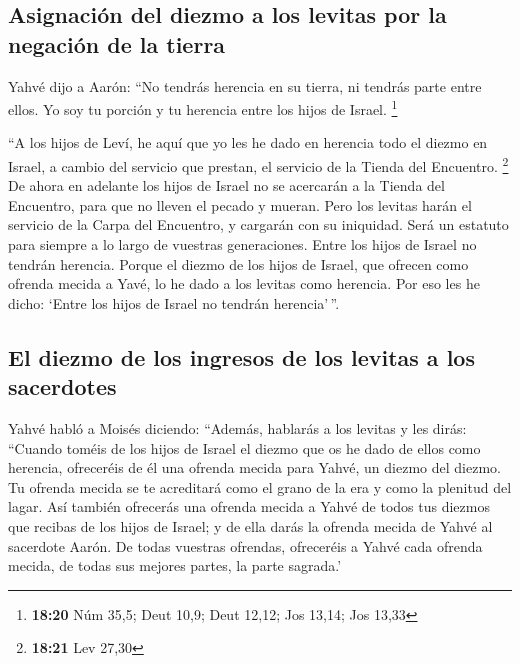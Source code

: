 \begin{paracol}{2}
\hypertarget{asignaciuxf3n-del-diezmo-a-los-levitas-por-la-negaciuxf3n-de-la-tierra}{%
\subsection{Asignación del diezmo a los levitas por la negación de la
tierra}\label{asignaciuxf3n-del-diezmo-a-los-levitas-por-la-negaciuxf3n-de-la-tierra}}

 Yahvé dijo a Aarón: ``No tendrás herencia en su tierra,
ni tendrás parte entre ellos. Yo soy tu porción y tu herencia entre los
hijos de Israel. \footnote{\textbf{18:20} Núm 35,5; Deut 10,9; Deut
  12,12; Jos 13,14; Jos 13,33}

 ``A los hijos de Leví, he aquí que yo les he dado en
herencia todo el diezmo en Israel, a cambio del servicio que prestan, el
servicio de la Tienda del Encuentro. \footnote{\textbf{18:21} Lev 27,30}
 De ahora en adelante los hijos de Israel no se acercarán
a la Tienda del Encuentro, para que no lleven el pecado y mueran.
 Pero los levitas harán el servicio de la Carpa del
Encuentro, y cargarán con su iniquidad. Será un estatuto para siempre a
lo largo de vuestras generaciones. Entre los hijos de Israel no tendrán
herencia.  Porque el diezmo de los hijos de Israel, que
ofrecen como ofrenda mecida a Yavé, lo he dado a los levitas como
herencia. Por eso les he dicho: `Entre los hijos de Israel no tendrán
herencia'\,''.

\hypertarget{el-diezmo-de-los-ingresos-de-los-levitas-a-los-sacerdotes}{%
\subsection{El diezmo de los ingresos de los levitas a los
sacerdotes}\label{el-diezmo-de-los-ingresos-de-los-levitas-a-los-sacerdotes}}

 Yahvé habló a Moisés diciendo:  ``Además,
hablarás a los levitas y les dirás: ``Cuando toméis de los hijos de
Israel el diezmo que os he dado de ellos como herencia, ofreceréis de él
una ofrenda mecida para Yahvé, un diezmo del diezmo.  Tu
ofrenda mecida se te acreditará como el grano de la era y como la
plenitud del lagar.  Así también ofrecerás una ofrenda
mecida a Yahvé de todos tus diezmos que recibas de los hijos de Israel;
y de ella darás la ofrenda mecida de Yahvé al sacerdote Aarón.
 De todas vuestras ofrendas, ofreceréis a Yahvé cada
ofrenda mecida, de todas sus mejores partes, la parte sagrada.'


\end{paracol}
